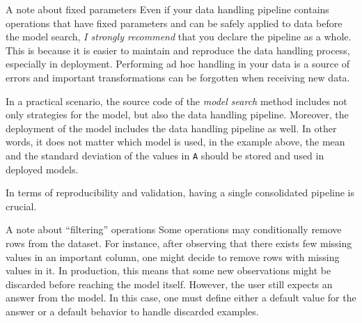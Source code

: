 \begin{hlbox}{A note about fixed parameters}
  Even if your data handling pipeline contains operations that have fixed parameters and
  can be safely applied to data before the model search, \emph{I strongly recommend} that
  you declare the pipeline as a whole.  This is because it is easier to maintain and
  reproduce the data handling process, especially in deployment.  Performing ad hoc
  handling in your data is a source of errors and important transformations can be
  forgotten when receiving new data.
\end{hlbox}

In a practical scenario, the source code of the \emph{model search} method includes not
only strategies for the model, but also the data handling pipeline.  Moreover, the deployment
of the model includes the data handling pipeline as well.  In other words, it does not
matter which model is used, in the example above, the mean and the standard deviation of
the values in \texttt{A} should be stored and used in deployed models.

In terms of reproducibility and validation, having a single consolidated pipeline is
crucial.

\begin{hlbox}{A note about ``filtering'' operations}
  Some operations may conditionally remove rows from the dataset.  For instance, after
  observing that there exists few missing values in an important column, one might decide
  to remove rows with missing values in it.  In production, this means that some new
  observations might be discarded before reaching the model itself.  However, the user
  still expects an answer from the model.  In this case, one must define either a default
  value for the answer or a default behavior to handle discarded examples.
\end{hlbox}


